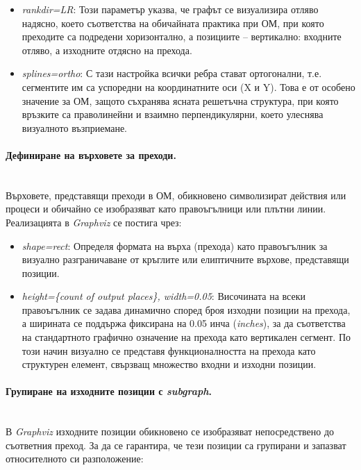 \begin{itemize}
    \item \textit{rankdir=LR}: Този параметър указва, че графът се визуализира отляво надясно, което съответства на обичайната практика при ОМ, при която преходите са подредени хоризонтално, а позициите -- вертикално: входните отляво, а изходните отдясно на прехода.
    \item \textit{splines=ortho}: С тази настройка всички ребра стават ортогонални, т.е. сегментите им са успоредни на координатните оси (X и Y). Това е от особено значение за ОМ, защото съхранява ясната решетъчна структура, при която връзките са праволинейни и взаимно перпендикулярни, което улеснява визуалното възприемане.
\end{itemize}

\paragraph{Дефиниране на върховете за преходи.}
\mbox{}\\
Върховете, представящи преходи в ОМ, обикновено символизират действия или процеси и обичайно се изобразяват като правоъгълници или плътни линии. Реализацията в \textit{Graphviz} се постига чрез:

\begin{itemize}
    \item \textit{shape=rect}: Определя формата на върха (прехода) като правоъгълник за визуално разграничаване от кръглите или елиптичните върхове, представящи позиции.
    \item \textit{height=\{count of output places\}, width=0.05}: Височината на всеки правоъгълник се задава динамично според броя изходни позиции на прехода, а ширината се поддържа фиксирана на 0.05 инча (\textit{inches}), за да съответства на стандартното графично означение на прехода като вертикален сегмент. По този начин визуално се представя функционалността на прехода като структурен елемент, свързващ множество входни и изходни позиции.
\end{itemize}

\paragraph{Групиране на изходните позиции с \textit{subgraph}.}
\mbox{}\\
В \textit{Graphviz} изходните позиции обикновено се изобразяват непосредствено до съответния преход. За да се гарантира, че тези позиции са групирани и запазват относителното си разположение:

